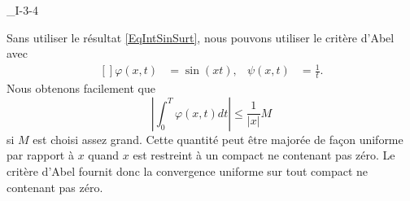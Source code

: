 \begin{corrige}{_I-3-4}
\begin{enumerate}
Sans utiliser le résultat \eqref{EqIntSinSurt}, nous pouvons utiliser le critère d'Abel avec
\begin{equation}
	\begin{aligned}[]
		\varphi(x,t)	&=\sin(xt),	&	\psi(x,t)	&=\frac{1}{ t }.
	\end{aligned}
\end{equation}
Nous obtenons facilement que
\begin{equation}
	|\int_0^T\varphi(x,t)dt |\leq\frac{1}{ | x | }M
\end{equation}
si $M$ est choisi assez grand. Cette quantité peut être majorée de façon uniforme par rapport à $x$ quand $x$ est restreint à un compact ne contenant pas zéro. Le critère d'Abel fournit donc la convergence uniforme sur tout compact ne contenant pas zéro.

\end{enumerate}

\end{corrige}
